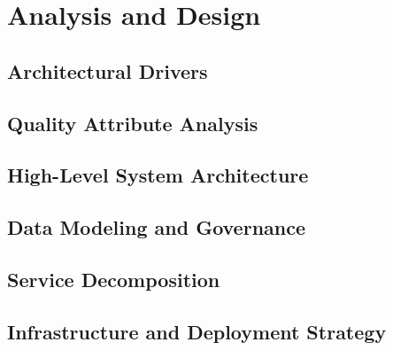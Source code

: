 \chapter{Analysis and Design}
\label{chap:analysis_design}

\section{Architectural Drivers}
\label{sec:arch_drivers}

\section{Quality Attribute Analysis}
\label{sec:quality_attributes}

\section{High-Level System Architecture}
\label{sec:high_level_arch}

\section{Data Modeling and Governance}
\label{sec:data_modeling}

\section{Service Decomposition}
\label{sec:service_decomposition}

\section{Infrastructure and Deployment Strategy}
\label{sec:infrastructure}
